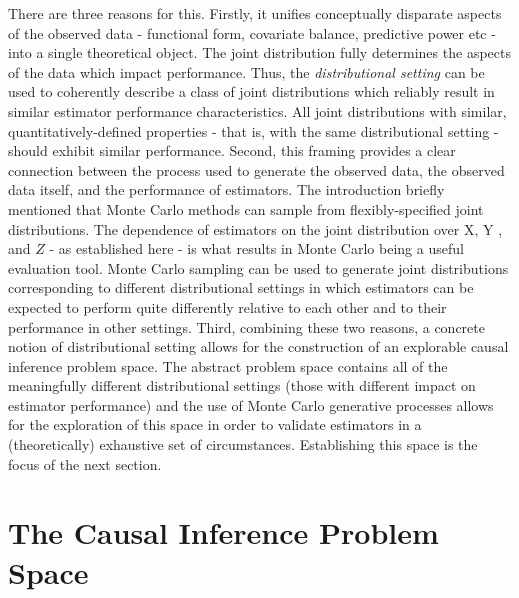 \documentclass[../main.tex]{subfiles}
\begin{document}
\vspace{\baselineskip}
There are three reasons for this. Firstly, it unifies conceptually disparate aspects of the observed data - functional form, covariate balance, predictive power etc - into a single theoretical object. The joint distribution fully determines the aspects of the data which impact performance. Thus, the \textit{distributional setting }can be used to coherently describe a class of joint distributions which reliably result in similar estimator performance characteristics. All joint distributions with similar, quantitatively-defined properties - that is, with the same distributional setting - should exhibit similar performance. Second, this framing provides a clear connection between the process used to generate the observed data, the observed data itself, and the performance of estimators. The introduction briefly mentioned that Monte Carlo methods can sample from flexibly-specified joint distributions. The dependence of estimators on the joint distribution over  \( \text{X, Y} \) , and  \( Z \)  - as established here - is what results in Monte Carlo being a useful evaluation tool. Monte Carlo sampling can be used to generate joint distributions corresponding to different distributional settings in which estimators can be expected to perform quite differently relative to each other and to their performance in other settings. Third, combining these two reasons, a concrete notion of distributional setting allows for the construction of an explorable causal inference problem space. The abstract problem space contains all of the meaningfully different distributional settings (those with different impact on estimator performance) and the use of Monte Carlo generative processes allows for the exploration of this space in order to validate estimators in a (theoretically) exhaustive set of circumstances. Establishing this space is the focus of the next section.\par

\section{The Causal Inference Problem Space}
\end{document}
